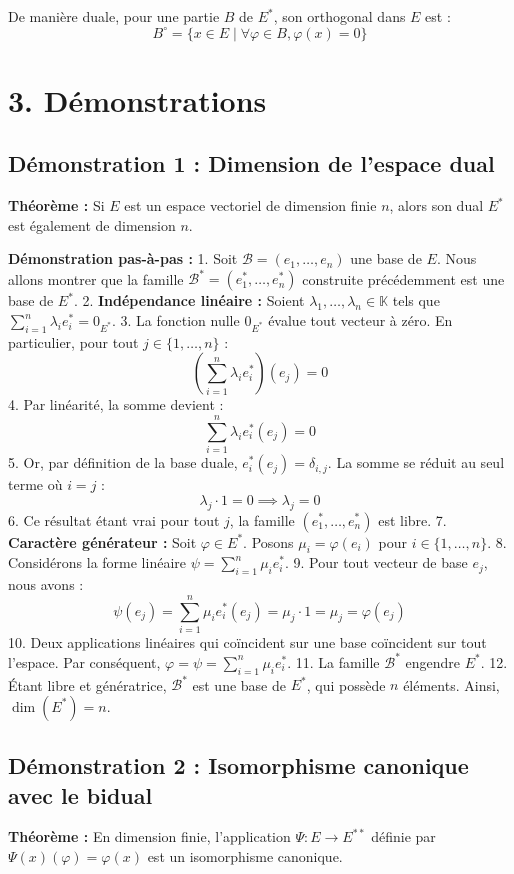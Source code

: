 \documentclass{report}
\begin{document}
De manière duale, pour une partie $B$ de $E^*$, son orthogonal dans $E$ est :
$$ B^\circ = \{ x \in E \mid \forall \varphi \in B, \varphi(x) = 0 \} $$

\section*{3. Démonstrations}

\subsection*{Démonstration 1 : Dimension de l'espace dual}
\textbf{Théorème :} Si $E$ est un espace vectoriel de dimension finie $n$, alors son dual $E^*$ est également de dimension $n$.

\textbf{Démonstration pas-à-pas :}
1. Soit $\mathcal{B} = (e_1, \dots, e_n)$ une base de $E$. Nous allons montrer que la famille $\mathcal{B}^* = (e_1^*, \dots, e_n^*)$ construite précédemment est une base de $E^*$.
2. \textbf{Indépendance linéaire :} Soient $\lambda_1, \dots, \lambda_n \in \mathbb{K}$ tels que $\sum_{i=1}^n \lambda_i e_i^* = 0_{E^*}$.
3. La fonction nulle $0_{E^*}$ évalue tout vecteur à zéro. En particulier, pour tout $j \in \{1, \dots, n\}$ :
   $$ \left( \sum_{i=1}^n \lambda_i e_i^* \right)(e_j) = 0 $$
4. Par linéarité, la somme devient :
   $$ \sum_{i=1}^n \lambda_i e_i^*(e_j) = 0 $$
5. Or, par définition de la base duale, $e_i^*(e_j) = \delta_{i,j}$. La somme se réduit au seul terme où $i = j$ :
   $$ \lambda_j \cdot 1 = 0 \implies \lambda_j = 0 $$
6. Ce résultat étant vrai pour tout $j$, la famille $(e_1^*, \dots, e_n^*)$ est libre.
7. \textbf{Caractère générateur :} Soit $\varphi \in E^*$. Posons $\mu_i = \varphi(e_i)$ pour $i \in \{1, \dots, n\}$.
8. Considérons la forme linéaire $\psi = \sum_{i=1}^n \mu_i e_i^*$.
9. Pour tout vecteur de base $e_j$, nous avons :
   $$ \psi(e_j) = \sum_{i=1}^n \mu_i e_i^*(e_j) = \mu_j \cdot 1 = \mu_j = \varphi(e_j) $$
10. Deux applications linéaires qui coïncident sur une base coïncident sur tout l'espace. Par conséquent, $\varphi = \psi = \sum_{i=1}^n \mu_i e_i^*$.
11. La famille $\mathcal{B}^*$ engendre $E^*$.
12. Étant libre et génératrice, $\mathcal{B}^*$ est une base de $E^*$, qui possède $n$ éléments. Ainsi, $\dim(E^*) = n$.

\subsection*{Démonstration 2 : Isomorphisme canonique avec le bidual}
\textbf{Théorème :} En dimension finie, l'application $\Psi : E \to E^{**}$ définie par $\Psi(x)(\varphi) = \varphi(x)$ est un isomorphisme canonique.
\end{document}

